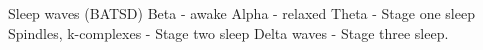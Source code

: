 \markdownRendererUlEndTight \markdownRendererInterblockSeparator
{}\markdownRendererInterblockSeparator
{}\markdownRendererUlBeginTight
\markdownRendererUlItem Sleep waves (BATSD)\markdownRendererInterblockSeparator
{}\markdownRendererUlBeginTight
\markdownRendererUlItem Beta - awake\markdownRendererUlItemEnd 
\markdownRendererUlItem Alpha - relaxed\markdownRendererUlItemEnd 
\markdownRendererUlItem Theta - Stage one sleep\markdownRendererUlItemEnd 
\markdownRendererUlItem Spindles, k-complexes - Stage two sleep\markdownRendererUlItemEnd 
\markdownRendererUlItem Delta waves - Stage three sleep.\markdownRendererUlItemEnd 
\markdownRendererUlEndTight \markdownRendererUlItemEnd 
\markdownRendererUlEndTight \relax